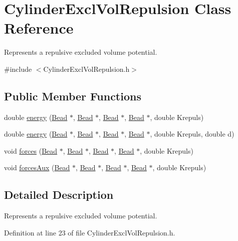 \hypertarget{classCylinderExclVolRepulsion}{\section{Cylinder\+Excl\+Vol\+Repulsion Class Reference}
\label{classCylinderExclVolRepulsion}
}


Represents a repulsive excluded volume potential.  




{\ttfamily \#include $<$Cylinder\+Excl\+Vol\+Repulsion.\+h$>$}

\subsection*{Public Member Functions}
\begin{DoxyCompactItemize}
\item 
double \hyperlink{classCylinderExclVolRepulsion_a68530aa2a28a75b0dc78eee760f60349}{energy} (\hyperlink{classBead}{Bead} $\ast$, \hyperlink{classBead}{Bead} $\ast$, \hyperlink{classBead}{Bead} $\ast$, \hyperlink{classBead}{Bead} $\ast$, double Krepuls)
\item 
double \hyperlink{classCylinderExclVolRepulsion_a42198905698d6e7a8c942e13797024f8}{energy} (\hyperlink{classBead}{Bead} $\ast$, \hyperlink{classBead}{Bead} $\ast$, \hyperlink{classBead}{Bead} $\ast$, \hyperlink{classBead}{Bead} $\ast$, double Krepuls, double d)
\item 
void \hyperlink{classCylinderExclVolRepulsion_a1b2462b37ffa24668b56198f9e966363}{forces} (\hyperlink{classBead}{Bead} $\ast$, \hyperlink{classBead}{Bead} $\ast$, \hyperlink{classBead}{Bead} $\ast$, \hyperlink{classBead}{Bead} $\ast$, double Krepuls)
\item 
void \hyperlink{classCylinderExclVolRepulsion_aed55ba4665827447777e57fe6acfbee6}{forces\+Aux} (\hyperlink{classBead}{Bead} $\ast$, \hyperlink{classBead}{Bead} $\ast$, \hyperlink{classBead}{Bead} $\ast$, \hyperlink{classBead}{Bead} $\ast$, double Krepuls)
\end{DoxyCompactItemize}


\subsection{Detailed Description}
Represents a repulsive excluded volume potential. 

Definition at line 23 of file Cylinder\+Excl\+Vol\+Repulsion.\+h.



